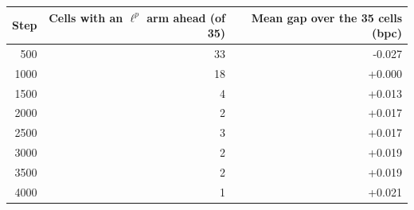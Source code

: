 \begin{tabular}{rrr}
\toprule
Step & Cells with an $\ell^p$ arm ahead (of 35) & Mean gap over the 35 cells (bpc) \\
\midrule
500 & 33 & -0.027 \\
1000 & 18 & +0.000 \\
1500 & 4 & +0.013 \\
2000 & 2 & +0.017 \\
2500 & 3 & +0.017 \\
3000 & 2 & +0.019 \\
3500 & 2 & +0.019 \\
4000 & 1 & +0.021 \\
\bottomrule
\end{tabular}
